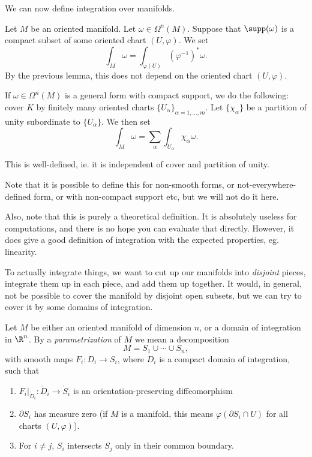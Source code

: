 \documentclass[a4paper]{article}
\begin{document}
We can now define integration over manifolds.

\begin{defi}
  Let $M$ be an oriented manifold. Let $\omega \in \Omega^n(M)$. Suppose that $\supp(\omega)$ is a compact subset of some oriented chart $(U, \varphi)$. We set
  \[
    \int_M \omega = \int_{\varphi(U)} (\varphi^{-1})^* \omega.
  \]
  By the previous lemma, this does not depend on the oriented chart $(U, \varphi)$.

  If $\omega \in \Omega^n(M)$ is a general form with compact support, we do the following: cover $K$ by finitely many oriented charts $\{U_\alpha\}_{\alpha = 1, \ldots, m}$. Let $\{\chi_\alpha\}$ be a partition of unity subordinate to $\{U_\alpha\}$. We then set
  \[
    \int_M \omega = \sum_\alpha \int_{U_\alpha} \chi_\alpha \omega.
  \]
\end{defi}

\begin{lemma}
  This is well-defined, ie. it is independent of cover and partition of unity.
\end{lemma}

Note that it is possible to define this for non-smooth forms, or not-everywhere-defined form, or with non-compact support etc, but we will not do it here.

Also, note that this is purely a theoretical definition. It is absolutely useless for computations, and there is no hope you can evaluate that directly. However, it does give a good definition of integration with the expected properties, eg. linearity.

To actually integrate things, we want to cut up our manifolds into \emph{disjoint} pieces, integrate them up in each piece, and add them up together. It would, in general, not be possible to cover the manifold by disjoint open subsets, but we can try to cover it by some domains of integration.

\begin{defi}[Parametrization]
  Let $M$ be either an oriented manifold of dimension $n$, or a domain of integration in $\R^n$. By a \emph{parametrization} of $M$ we mean a decomposition
  \[
    M = S_1 \cup \cdots \cup S_n,
  \]
  with smooth maps $F_i: D_i \to S_i$, where $D_i$ is a compact domain of integration, such that
  \begin{enumerate}
    \item $F_i|_{\mathring{D}_i}: \mathring{D}_i \to \mathring{S}_i$ is an orientation-preserving diffeomorphism
    \item $\partial S_i$ has measure zero (if $M$ is a manifold, this means $\varphi(\partial S_i \cap U)$ for all charts $(U, \varphi)$).
    \item For $i \not= j$, $S_i$ intersects $S_j$ only in their common boundary.
  \end{enumerate}
\end{defi}
\end{document}
